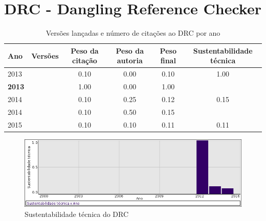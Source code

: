 \section{DRC - Dangling Reference Checker}


\begin{table}[H]
\caption{Versões lançadas e número de citações ao DRC por ano}
\centering
\begin{tabular}{| l | c | c | c | c | c |}
  \hline
  Ano & Versões & Peso da citação & Peso da autoria & Peso final & Sustentabilidade técnica \\
  \hline
            2013
          &
          
          &
          0.10
          &
          0.00
          &
          0.10
          &
            {\color{blue} 1.00}
          \\
            {\bf 2013}
          &
          
          &
          1.00
          &
          0.00
          &
          1.00
          &
          \\
\hline
            2014
          &
          
          &
          0.10
          &
          0.25
          &
          0.12
          &
            {\color{red} 0.15}
          \\
            2014
          &
          
          &
          0.10
          &
          0.50
          &
          0.15
          &
          \\
\hline
            2015
          &
          
          &
          0.10
          &
          0.10
          &
          0.11
          &
            {\color{red} 0.11}
          \\
\hline
\end{tabular}
\end{table}

\begin{figure}[h]
  \center
  \includegraphics[scale=0.50]{imagens/softwares-charts/drc.png}
  \caption{Sustentabilidade técnica do DRC}
\end{figure}


